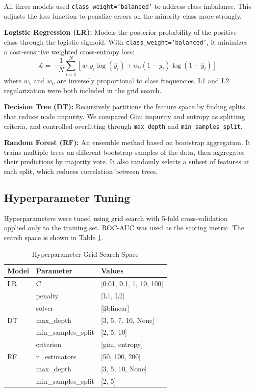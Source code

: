 \documentclass[conference]{IEEEtran}
\begin{document}
All three models used \texttt{class\_weight=`balanced'} to address class imbalance. This adjusts the loss function to penalize errors on the minority class more strongly.

\textbf{Logistic Regression (LR):} Models the posterior probability of the positive class through the logistic sigmoid. With \texttt{class\_weight=`balanced'}, it minimizes a cost-sensitive weighted cross-entropy loss:
\begin{equation}
\mathcal{L} = -\frac{1}{N}\sum_{i=1}^{N}\left[w_1 y_i \log(\hat{y}_i) + w_0(1-y_i)\log(1-\hat{y}_i)\right]
\label{eq:loss}
\end{equation}
where $w_1$ and $w_0$ are inversely proportional to class frequencies. L1 and L2 regularization were both included in the grid search.

\textbf{Decision Tree (DT):} Recursively partitions the feature space by finding splits that reduce node impurity. We compared Gini impurity and entropy as splitting criteria, and controlled overfitting through \texttt{max\_depth} and \texttt{min\_samples\_split}.

\textbf{Random Forest (RF):} An ensemble method based on bootstrap aggregation. It trains multiple trees on different bootstrap samples of the data, then aggregates their predictions by majority vote. It also randomly selects a subset of features at each split, which reduces correlation between trees.

\subsection{Hyperparameter Tuning}

Hyperparameters were tuned using grid search with 5-fold cross-validation applied only to the training set. ROC-AUC was used as the scoring metric. The search space is shown in Table \ref{tab:grid}.

\begin{table}[htbp]
\caption{Hyperparameter Grid Search Space}
\begin{center}
\begin{tabular}{llp{3.5cm}}
\toprule
\textbf{Model} & \textbf{Parameter} & \textbf{Values} \\
\midrule
LR & C & [0.01, 0.1, 1, 10, 100] \\
   & penalty & [L1, L2] \\
   & solver & [liblinear] \\
\midrule
DT & max\_depth & [3, 5, 7, 10, None] \\
   & min\_samples\_split & [2, 5, 10] \\
   & criterion & [gini, entropy] \\
\midrule
RF & n\_estimators & [50, 100, 200] \\
   & max\_depth & [3, 5, 10, None] \\
   & min\_samples\_split & [2, 5] \\
\bottomrule
\end{tabular}
\label{tab:grid}
\end{center}
\end{table}
\end{document}
